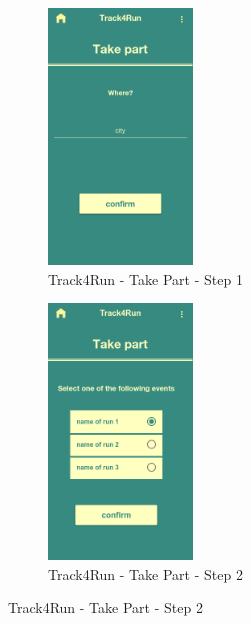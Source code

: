 \begin{figure}[H]
\centering
\begin{subfigure}{.5\textwidth}
    \includegraphics[width=.9\linewidth, height = 6.8cm, keepaspectratio]{./Images/Mockups/Track4Run/T4R_TakePart1.png}
    \centering
    \caption{Track4Run - Take Part - Step 1}
  \end{subfigure}%
\begin{subfigure}{.5\textwidth}
    \includegraphics[width=.9\linewidth, height = 6.8cm, keepaspectratio]{./Images/Mockups/Track4Run/T4R_TakePart2.png}
    \centering
    \caption{Track4Run - Take Part - Step 2}
  \end{subfigure}
\end{figure}
  



